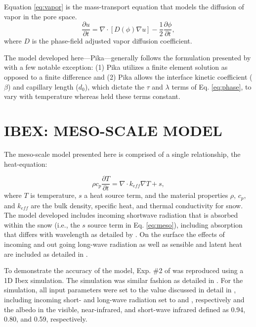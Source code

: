 Equation \ref{eq:vapor} is the mass-transport equation that models the diffusion of vapor in the pore space.
\begin{equation}\label{eq:vapor}
\frac{\partial u}{\partial t} = \nabla \cdot[ D(\phi) \nabla u] - \frac{1}{2}\frac{\partial \phi}{\partial t},
\end{equation}
where $D$ is the phase-field adjusted vapor diffusion coefficient.

The model developed here---Pika---generally follows the formulation presented by \citet{kaempfer2009phase} with a few notable exception: (1) Pika utilizes a finite element solution as opposed to a finite difference and (2) Pika allows the interface kinetic coefficient ($\beta$) and capillary length ($d_0$), which dictate the $\tau$ and $\lambda$ terms of Eq. \eqref{eq:phase}, to vary with temperature whereas \citet{kaempfer2009phase} held these terms constant.

\section{IBEX: MESO-SCALE MODEL}\label{sec:ibex}
The meso-scale model presented here is comprised of a single relationship, the heat-equation:

\begin{equation}\label{eq:meso}
\rho c_p \frac{\partial{T}}{\partial t} = \nabla \cdot k_{eff} \nabla T + s,
\end{equation}
where $T$ is temperature, $s$ a heat source term, and the material properties $\rho$, $c_p$, and $k_{eff}$ are the bulk density, specific heat, and thermal conductivity for snow. The model developed includes incoming shortwave radiation that is absorbed within the snow (i.e., the $s$ source term in Eq. \eqref{eq:meso}), including absorption that differs with wavelength as detailed by \citet[][Ch. 4]{slaughter2010numerical}. On the surface the effects of incoming and out going long-wave radiation as well as sensible and latent heat are included as detailed in \citet{morstad2007experimental}.

To demonstrate the accuracy of the model, Exp. \#2 of \citet{morstad2007experimental} was reproduced using a 1D Ibex simulation. The simulation was similar fashion as detailed in \citet[][Ch. 4]{slaughter2010numerical}. For the simulation, all input parameters were set to the value discussed in detail in \citet{slaughter2010numerical}, including incoming short- and long-wave radiation set to  and , respectively and the albedo in the visible, near-infrared, and short-wave infrared defined as 0.94, 0.80, and 0.59, respectively.

